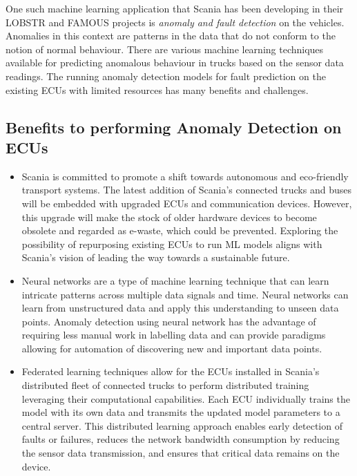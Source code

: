 One such machine learning application that Scania has been developing in their \textsc{LOBSTR} \cite{lobstr} and \textsc{FAMOUS} \cite{famous} projects is \textit{anomaly and fault detection} on the vehicles. Anomalies in this context are patterns in the data that do not conform to the notion of normal behaviour. There are various machine learning techniques available for predicting anomalous behaviour in trucks based on the sensor data readings. The running anomaly detection models for fault prediction on the existing ECUs with limited resources has many benefits and challenges.

\subsection*{Benefits to performing Anomaly Detection on ECUs}

\begin{itemize}
	\item Scania is committed to promote a shift towards autonomous and eco-friendly transport systems. The latest addition of Scania's connected trucks and buses will be embedded with upgraded ECUs and communication devices. However, this upgrade will make the stock of older hardware devices to become obsolete and regarded as e-waste, which could be prevented. Exploring the possibility of repurposing existing ECUs to run ML models aligns with Scania's vision of leading the way towards a sustainable future.
	\item Neural networks are a type of machine learning technique that can learn intricate patterns across multiple data signals and time. Neural networks can learn from unstructured data and apply this understanding to unseen data points. Anomaly detection using neural network has the advantage of requiring less manual work in labelling data and can provide paradigms allowing for automation of discovering new and important data points.
	\item Federated learning techniques allow for the ECUs installed in Scania's distributed fleet of connected trucks to perform distributed training leveraging their computational capabilities. Each ECU individually trains the model with its own data and transmits the updated model parameters to a central server. This distributed learning approach enables early detection of faults or failures, reduces the network bandwidth consumption by reducing the sensor data transmission, and ensures that critical data remains on the device.
\end{itemize}

